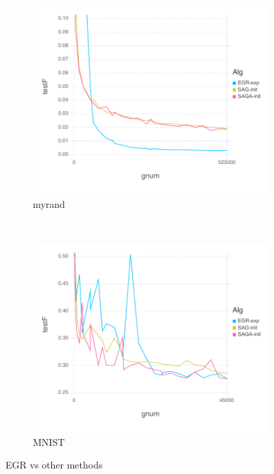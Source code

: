 \documentclass[11pt]{article}
\begin{document}
   
   \begin{figure}[H]
       \centering
       \begin{subfigure}[b]{0.45\textwidth}
           \includegraphics[width=\textwidth]{Figures/myrandBLtrueFfFinal-g.pdf}
           \caption{myrand}
       \end{subfigure}
       ~ %
         \begin{subfigure}[b]{0.45\textwidth}
           \includegraphics[width=\textwidth]{Figures/MNISTBLtrueFfFinal-g.pdf}
             \caption{MNIST}
         \end{subfigure}
       \caption{EGR vs other methods}\label{fig:myrandom}
   \end{figure}
   
\end{document}
